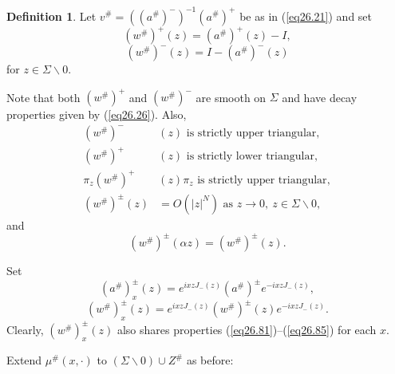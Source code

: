 \documentclass{surv-l}
\theoremstyle{plain}
\theoremstyle{definition}
\newtheorem{definition}[theorem]{Definition}
\numberwithin{equation}{chapter}
\begin{document}
\renewcommand\thetheorem{26.\arabic{theorem}}
\setcounter{theorem}{77}
\begin{definition}\label{defi26.78}
Let $v^{\#}=((a^{\#})^{-})^{-1}(a^{\#})^{+}$ be as in (\ref{eq26.21}) and set
\setcounter{equation}{78}
\begin{equation}\label{eq26.79}
(w^{\#})^{+}(z)=(a^{\#})^{+}(z)-I,
\end{equation}
\begin{equation}\label{eq26.80}
(w^{\#})^{-}(z)=I-(a^{\#})^{-}(z)
\end{equation}
for $z\in\Sigma\backslash 0 $.

Note that both $(w^{\#})^{+}$ and $(w^{\#})^{-}$ are smooth on $\Sigma$ and have decay properties given by (\ref{eq26.26}). Also,
\begin{align}\label{eq26.81}
(w^{\#})^{-}&(z) \text{ is strictly upper triangular},\\\label{eq26.82}
(w^{\#})^{+}&(z)\text{ is strictly lower triangular},\\\label{eq26.83}
\pi_{z}(w^{\#})^{+}&(z)\pi_{z}\text{ is strictly upper triangular},\\\label{eq26.84}
(w^{\#})^{\pm}(z)&=O(|z|^{N}) \text{ as } z\rightarrow 0,\ z\in\Sigma\backslash 0,
\end{align}
and
\begin{equation}\label{eq26.85}
(w^{\#})^{\pm}(\alpha z)=(w^{\#})^{\pm}(z).
\end{equation}

Set
\begin{equation*}
(a^{\#})_{x}^{\pm}(z)=e^{ixzJ_{-}(z)}(a^{\#})^{\pm}e^{-ixzJ_{-}(z)},
\end{equation*}
\begin{equation*}
(w^{\#})_{x}^{\pm}(z)=e^{ixzJ_{-}(z)}(w^{\#})^{\pm}(z)e^{-ixzJ_{-}(z)}.
\end{equation*}
Clearly, $(w^{\#})_{x}^{\pm}(z)$ also shares properties
(\ref{eq26.81})--(\ref{eq26.85}) for each $x$.

Extend $\mu^{\#}(x, \cdot)$ to $(\Sigma\backslash 0)\cup Z^{\#}$ as before:
\end{definition}
\end{document}
